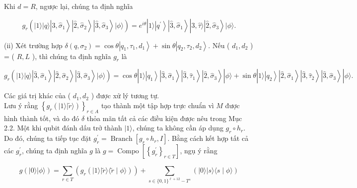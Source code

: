 \documentclass[10pt]{article}
\begin{document}
Khi $d=R$, ngược lại, chúng ta định nghĩa

$$
g_{r}\left(|1\rangle|q\rangle\left|\hat{3}, \hat{\sigma}_{1}\right\rangle\left|\hat{2}, \hat{\sigma}_{2}\right\rangle\left|\hat{3}, \hat{\sigma}_{3}\right\rangle|\phi\rangle\right)=e^{i \theta}|1\rangle\left|q^{\prime}\right\rangle\left|\hat{3}, \hat{\sigma}_{1}\right\rangle|\hat{3}, \hat{\tau}\rangle\left|\hat{2}, \hat{\sigma}_{3}\right\rangle|\phi\rangle .
$$

(ii) Xét trường hợp $\delta\left(q, \sigma_{2}\right)=\cos \theta\left|q_{1}, \tau_{1}, d_{1}\right\rangle+\sin \theta\left|q_{2}, \tau_{2}, d_{2}\right\rangle$. Nếu ( $d_{1}, d_{2}$ ) = ( $R, L$ ), thì chúng ta định nghĩa $g_{r}$ là

$$
g_{r}\left(|1\rangle|q\rangle\left|\hat{3}, \hat{\sigma}_{1}\right\rangle\left|\hat{2}, \hat{\sigma}_{2}\right\rangle\left|\hat{3}, \hat{\sigma}_{3}\right\rangle|\phi\rangle\right)=\cos \theta|1\rangle\left|q_{1}\right\rangle\left|\hat{3}, \hat{\sigma}_{1}\right\rangle\left|\hat{3}, \hat{\tau}_{1}\right\rangle\left|\hat{2}, \hat{\sigma}_{3}\right\rangle|\phi\rangle+\sin \theta|1\rangle\left|q_{2}\right\rangle\left|\hat{2}, \hat{\sigma}_{1}\right\rangle\left|\hat{3}, \hat{\tau}_{2}\right\rangle\left|\hat{3}, \hat{\sigma}_{3}\right\rangle|\phi\rangle .
$$

Các giá trị khác của ( $d_{1}, d_{2}$ ) được xử lý tương tự.\\
Lưu ý rằng $\left\{g_{r}(|1\rangle|\tilde{r}\rangle)\right\}_{r \in A}$ tạo thành một tập hợp trực chuẩn vì $M$ được hình thành tốt, và do đó $\delta$ thỏa mãn tất cả các điều kiện được nêu trong Mục 2.2. Một khi qubit đánh dấu trở thành $|1\rangle$, chúng ta không cần áp dụng $g_{r} \circ h_{r}$. Do đó, chúng ta tiếp tục đặt $g_{r}^{\prime}=\operatorname{Branch}\left[g_{r} \circ h_{r}, I\right]$. Bằng cách kết hợp tất cả các $g_{r}^{\prime}$, chúng ta định nghĩa $g$ là $g=\operatorname{Compo}\left[\left\{g_{r}^{\prime}\right\}_{r \in T}\right]$, ngụ ý rằng

$$
g(|0\rangle|\phi\rangle)=\sum_{r \in T}\left(g_{r}(|1\rangle|\tilde{r}\rangle\langle\tilde{r} \mid \phi\rangle)\right)+\sum_{s \in\{0,1\}^{\ell+12}-T^{\diamond}}(|0\rangle|s\rangle\langle s \mid \phi\rangle)
$$
\end{document}
